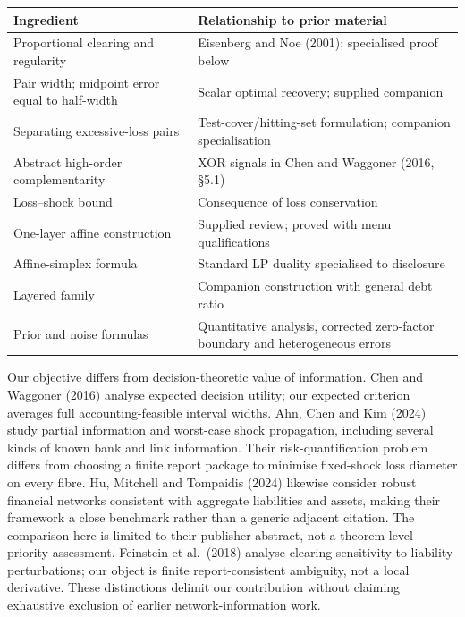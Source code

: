\documentclass[
  british,
  11pt,
  a4paper,
]{article}
\newcounter{none} %
\begin{document}
{\def\LTcaptype{none} %
\begin{longtable}[]{@{}
  >{\raggedright\arraybackslash}p{}
  >{\raggedright\arraybackslash}p{}@{}}
\toprule\noalign{}
\begin{minipage}[b]{\linewidth}\raggedright
Ingredient
\end{minipage} & \begin{minipage}[b]{\linewidth}\raggedright
Relationship to prior material
\end{minipage} \\
\midrule\noalign{}
\endhead
\bottomrule\noalign{}
\endlastfoot
Proportional clearing and regularity & Eisenberg and Noe (2001);
specialised proof below \\
Pair width; midpoint error equal to half-width & Scalar optimal
recovery; supplied companion \\
Separating excessive-loss pairs & Test-cover/hitting-set formulation;
companion specialisation \\
Abstract high-order complementarity & XOR signals in Chen and Waggoner
(2016, §5.1) \\
Loss--shock bound & Consequence of loss conservation \\
One-layer affine construction & Supplied review; proved with menu
qualifications \\
Affine-simplex formula & Standard LP duality specialised to
disclosure \\
Layered family & Companion construction with general debt ratio \\
Prior and noise formulas & Quantitative analysis, corrected zero-factor
boundary and heterogeneous errors \\
\end{longtable}
}

Our objective differs from decision-theoretic value of information. Chen
and Waggoner (2016) analyse expected decision utility; our expected
criterion averages full accounting-feasible interval widths. Ahn, Chen
and Kim (2024) study partial information and worst-case shock
propagation, including several kinds of known bank and link information.
Their risk-quantification problem differs from choosing a finite report
package to minimise fixed-shock loss diameter on every fibre. Hu,
Mitchell and Tompaidis (2024) likewise consider robust financial
networks consistent with aggregate liabilities and assets, making their
framework a close benchmark rather than a generic adjacent citation. The
comparison here is limited to their publisher abstract, not a
theorem-level priority assessment. Feinstein et al.~(2018) analyse
clearing sensitivity to liability perturbations; our object is finite
report-consistent ambiguity, not a local derivative. These distinctions
delimit our contribution without claiming exhaustive exclusion of
earlier network-information work.
\end{document}
